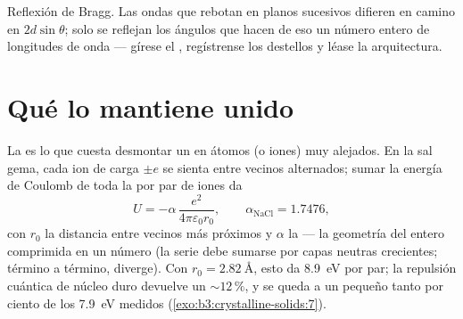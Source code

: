 \begin{omfigure}

{\small Reflexión de Bragg. Las ondas que rebotan en planos sucesivos
difieren en camino en $2d\sin\theta$; solo se reflejan los ángulos que hacen de eso un número
entero de longitudes de onda --- gírese el , regístrense
los destellos y léase la arquitectura.}
\end{omfigure}

\section{Qué lo mantiene unido}

\begin{proposition}\label{prop:b3:crystalline-solids:madelung}
La \emph{} es lo que cuesta desmontar un 
en átomos (o iones) muy alejados. En la sal gema, cada ion de carga
$\pm e$ se sienta entre vecinos alternados; sumar la energía de Coulomb de
toda la  por par de iones da
\[
U = -\alpha\,\frac{e^2}{4\pi\varepsilon_0 r_0} ,
\qquad \alpha_{\text{NaCl}} = 1.7476 ,
\]
con $r_0$ la distancia entre vecinos más próximos y $\alpha$ la
\emph{} --- la geometría del  entero
comprimida en un número (la serie debe sumarse por capas neutras
crecientes; término a término, diverge). Con $r_0 =
\qty{2.82}{\angstrom}$, esto da \qty{8.9}{eV} por par;
la repulsión cuántica de núcleo duro devuelve un $\sim12\,\%$, y se queda a un
pequeño tanto por ciento de los \qty{7.9}{eV} medidos
(\cref{exo:b3:crystalline-solids:7}).
\end{proposition}
\admitted

